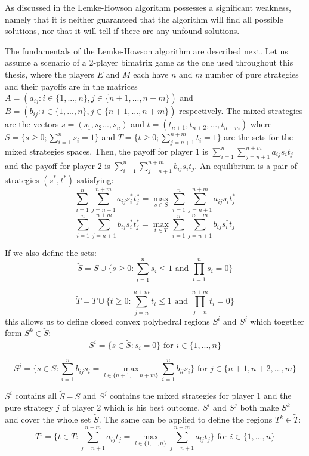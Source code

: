 As discussed in \citet{shapley1974note} the Lemke-Howson algorithm possesses a significant weakness, namely that it is neither guaranteed that the algorithm will find all possible solutions, nor that it will tell if there are any unfound solutions.

The fundamentals of the Lemke-Howson algorithm are described next. Let us assume a scenario of a 2-player bimatrix game as the one used throughout this thesis, where the players $E$ and $M$ each have $n$ and $m$ number of pure strategies and their payoffs are in the matrices $A = (a_{ij}: i \in \{1,...,n\}, j \in \{ n+1,...,n+m\})$ and $B = (b_{ij}: i \in \{1,...,n\}, j \in \{n+1,...,n+m\})$ respectively. The mixed strategies are the vectors $s=(s_1,s_2...,s_n)$ and $t=(t_{n+1},t_{n+2},...,t_{n+m})$ where $S = \{s \geq 0; \sum_{i=1}^{n}s_i = 1\}$ and $T = \{t \geq 0; \sum_{j=n+1}^{n+m}t_i = 1\}$ are the sets for the mixed strategies spaces. Then, the payoff for player 1 is $\sum_{i=1}^{n}\sum_{j=n+1}^{n+m} a_{ij} s_i t_j$ and the payoff for player 2 is $\sum_{i=1}^{n} \sum_{j=n+1}^{n+m} b_{ij} s_i t_j$. An equilibrium is a pair of strategies $(s^*,t^*)$ satisfying:
\[
\sum_{i=1}^{n} \sum_{j=n+1}^{n+m} a_{ij}s_i^*t_j^* = \max_{s \in S} \sum_{i=1}^{n} \sum_{j=n+1}^{n+m} a_{ij}s_i t_j^*
\]
\[
\sum_{i=1}^{n} \sum_{j=n+1}^{n+m} b_{ij}s_i^*t_j^* = \max_{t \in T} \sum_{i=1}^{n} \sum_{j=n+1}^{n+m} b_{ij}s_i^* t_j
\]

If we also define the sets:
\[
\tilde{S} =  S \cup \{ s \geq 0: \sum_{i=1}^{n} s_i \leq 1 \text{ and } \prod_{i=1}^{n} s_i = 0 \}
\]

\[
\tilde{T} = T \cup \{t \geq 0: \sum_{j=n}^{n+m} t_i \leq 1 \text{ and } \prod_{j=n}^{n+m} t_i = 0 \}
\]
this allows us to define closed convex polyhedral regions $S^i$ and $S^j$ which together form $S^k \in \tilde{S}$:
\[
S^i = \{ s \in \tilde{S}: s_i = 0 \} \text{ for } i \in \{1,...,n\}
\]

\[
S^j = \{ s \in S: \sum_{i=1}^{n} b_{ij} s_i = \max_{l \in \{n+1,...,n+m\}} \sum_{i=1}^{n} b_{il} s_i \} \text{ for } j \in \{n+1,n+2,...,m\}
\]

$S^i$ contains all $\tilde{S}-S$ and $S^j$ contains the mixed strategies for player 1 and the pure strategy $j$ of player 2 which is his best outcome. $S^i$ and $S^j$ both make $S^k$ and cover the whole set $\tilde{S}$. The same can be applied to define the regions $T^k \in \tilde{T}$:
\[ 
T^i = \{ t \in T: \sum_{j=n+1}^{n+m} a_{ij} t_j = \max_{l \in \{1,...,n\}} \sum_{j=n+1}^{n+m} a_{lj} t_j \} \text{ for } i \in \{1,...,n\} 
\]

